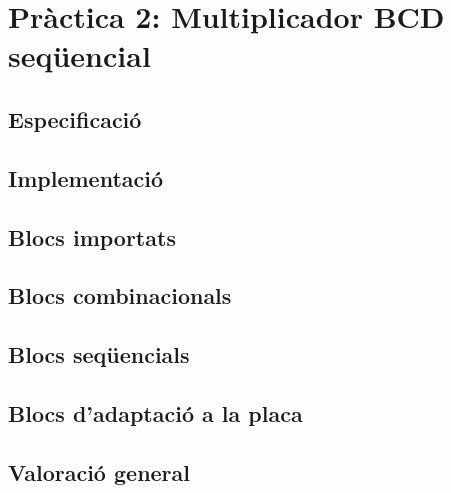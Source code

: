 \chapter{Pràctica 2: Multiplicador BCD seqüencial}

\section{Especificació}

\section{Implementació}


\section{Blocs importats}

\section{Blocs combinacionals}

\section{Blocs seqüencials}

\section{Blocs d'adaptació a la placa}

\section{Valoració general}


